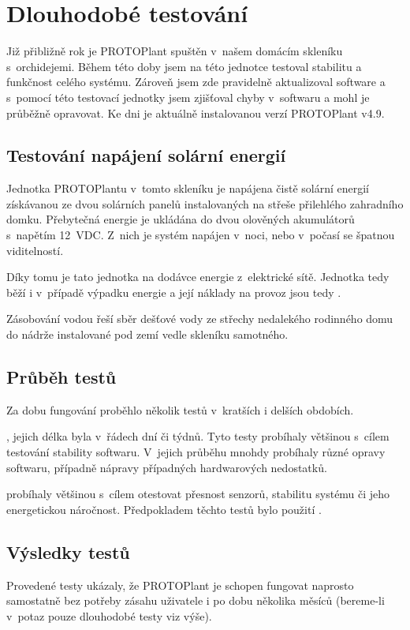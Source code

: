 \chapter{Dlouhodobé testování}
Již přibližně rok je PROTOPlant spuštěn v~našem domácím skleníku s~orchidejemi.
Během této doby jsem na této jednotce testoval stabilitu a funkčnost celého systému. 
Zároveň jsem zde pravidelně aktualizoval software a s~pomocí této testovací jednotky jsem zjišťoval chyby v~softwaru a mohl je průběžně opravovat.
Ke dni  je aktuálně instalovanou verzí PROTOPlant v4.9.

\section{Testování napájení solární energií}
\label{sec:SolarPower}
Jednotka PROTOPlantu v~tomto skleníku je napájena čistě solární energií získávanou ze dvou solárních panelů instalovaných na střeše přilehlého zahradního domku.
Přebytečná energie je ukládána do dvou olověných akumulátorů s~napětím 12~VDC.
Z~nich je systém napájen v~noci, nebo v~počasí se špatnou viditelností.

Díky tomu je tato jednotka  na dodávce energie z~elektrické sítě.
Jednotka tedy běží i v~případě výpadku energie a její náklady na provoz jsou tedy .

Zásobování vodou řeší sběr dešťové vody ze střechy nedalekého rodinného domu do nádrže instalované pod zemí vedle skleníku samotného.

\section{Průběh testů}
Za dobu fungování proběhlo několik testů v~kratších i delších obdobích. \newline

\noindent{}, jejich délka byla v~řádech dní či týdnů. 
Tyto testy probíhaly většinou s~cílem testování stability softwaru.
V~jejich průběhu mnohdy probíhaly různé opravy softwaru, případně nápravy případných hardwarových nedostatků. \newline

\noindent{} probíhaly většinou s~cílem otestovat přesnost senzorů, stabilitu systému či jeho energetickou náročnost.
Předpokladem těchto testů bylo použití . 

\section{Výsledky testů}
Provedené testy ukázaly, že PROTOPlant je schopen fungovat naprosto samostatně bez potřeby zásahu uživatele i po dobu několika měsíců (bereme-li v~potaz pouze dlouhodobé testy viz výše).

\newpage